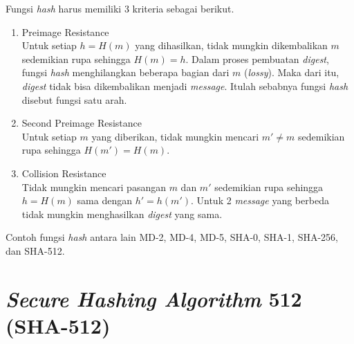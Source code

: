 Fungsi \textit{hash} harus memiliki 3 kriteria sebagai berikut\cite{forouzan2007cryptography}.

\begin{enumerate}
	\item Preimage Resistance \\
	Untuk setiap \begin{math}h=H(m)\end{math} yang dihasilkan, tidak mungkin dikembalikan \begin{math}m\end{math} sedemikian rupa sehingga \begin{math}H(m)=h\end{math}. Dalam proses pembuatan \textit{digest}, fungsi \textit{hash} menghilangkan beberapa bagian dari \begin{math}m\end{math} (\textit{lossy}). Maka dari itu, \textit{digest} tidak bisa dikembalikan menjadi \textit{message}. Itulah sebabnya fungsi \textit{hash} disebut fungsi satu arah.
	\item Second Preimage Resistance \\
	Untuk setiap \begin{math}m\end{math} yang diberikan, tidak mungkin mencari \begin{math}m' \neq m\end{math} sedemikian rupa sehingga \begin{math}H(m') = H(m)\end{math}.
	\item Collision Resistance \\
	Tidak mungkin mencari pasangan \begin{math}m\end{math} dan \begin{math}m'\end{math} sedemikian rupa sehingga \begin{math}h=H(m)\end{math} sama dengan \begin{math}h'=h(m')\end{math}. Untuk 2 \textit{message} yang berbeda tidak mungkin menghasilkan \textit{digest} yang sama.
\end{enumerate}

Contoh fungsi \textit{hash} antara lain MD-2, MD-4, MD-5, SHA-0, SHA-1, SHA-256, dan SHA-512.

\section{\textit{Secure Hashing Algorithm} 512 (SHA-512)}\label{sec:SHA512}

